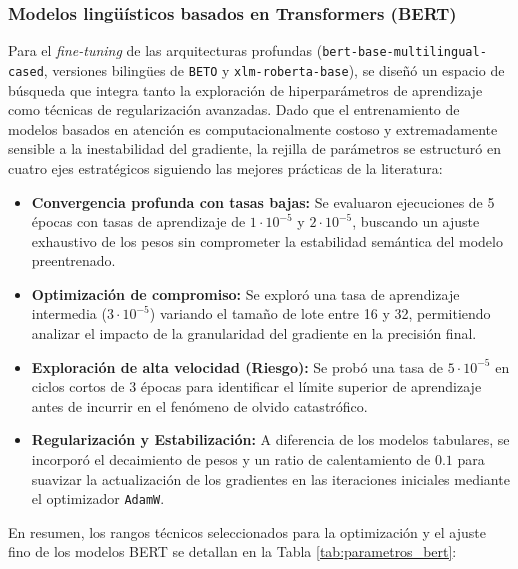 \documentclass[12pt,a4paper,onecolumn,oneside]{report}
\begin{document}
\subsubsection{Modelos lingüísticos basados en Transformers (BERT)}
Para el \textit{fine-tuning} de las arquitecturas profundas (\texttt{bert-base-multilingual-cased}, versiones bilingües de \texttt{BETO} y \texttt{xlm-roberta-base}), se diseñó un espacio de búsqueda que integra tanto la exploración de hiperparámetros de aprendizaje como técnicas de regularización avanzadas. Dado que el entrenamiento de modelos basados en atención es computacionalmente costoso y extremadamente sensible a la inestabilidad del gradiente, la rejilla de parámetros se estructuró en cuatro ejes estratégicos siguiendo las mejores prácticas de la literatura:

\begin{itemize}
    \item \textbf{Convergencia profunda con tasas bajas:} Se evaluaron ejecuciones de 5 épocas con tasas de aprendizaje de $1\cdot10^{-5}$ y $2\cdot10^{-5}$, buscando un ajuste exhaustivo de los pesos sin comprometer la estabilidad semántica del modelo preentrenado.
    \item \textbf{Optimización de compromiso:} Se exploró una tasa de aprendizaje intermedia ($3\cdot10^{-5}$) variando el tamaño de lote  entre 16 y 32, permitiendo analizar el impacto de la granularidad del gradiente en la precisión final.
    \item \textbf{Exploración de alta velocidad (Riesgo):} Se probó una tasa de $5\cdot10^{-5}$ en ciclos cortos de 3 épocas para identificar el límite superior de aprendizaje antes de incurrir en el fenómeno de olvido catastrófico.
    \item \textbf{Regularización y Estabilización:} A diferencia de los modelos tabulares, se incorporó el decaimiento de pesos y un ratio de calentamiento de $0.1$ para suavizar la actualización de los gradientes en las iteraciones iniciales mediante el optimizador \texttt{AdamW}.
\end{itemize}

En resumen, los rangos técnicos seleccionados para la optimización y el ajuste fino de los modelos BERT se detallan en la Tabla \ref{tab:parametros_bert}:
\end{document}
